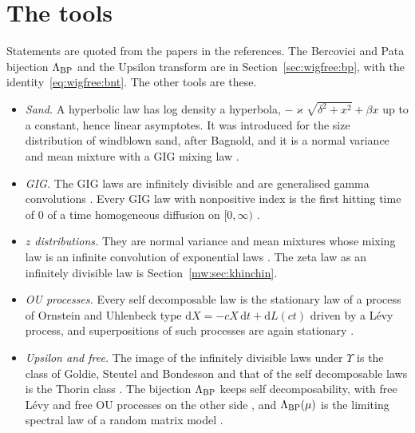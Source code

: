 \section{The tools}\label{bn:sec:tools}
Statements are quoted from the papers in the references. The Bercovici and Pata bijection $\Lambda_{\rm BP}$ and the Upsilon transform are in Section~\ref{sec:wigfree:bp}, with the identity~\eqref{eq:wigfree:bnt}. The other tools are these.
\begin{itemize}
\item \textit{Sand.} A hyperbolic law has log density a hyperbola, $-\varkappa\sqrt{\delta^2+x^2}+\beta x$ up to a constant, hence linear asymptotes. It was introduced for the size distribution of windblown sand, after Bagnold, and it is a normal variance and mean mixture with a GIG mixing law \cite{BN77}.
\item \textit{GIG.} The GIG laws are infinitely divisible \cite{BNH77} and are generalised gamma convolutions \cite{Halgreen79}. Every GIG law with nonpositive index is the first hitting time of $0$ of a time homogeneous diffusion on $[0,\infty)$ \cite{BBH78}.
\item \textit{$z$ distributions.} They are normal variance and mean mixtures whose mixing law is an infinite convolution of exponential laws \cite{BNKS82}. The zeta law as an infinitely divisible law is Section~\ref{mw:sec:khinchin}.
\item \textit{OU processes.} Every self decomposable law is the stationary law of a process of Ornstein and Uhlenbeck type $\mathrm dX=-cX\,\mathrm dt+\mathrm dL(ct)$ driven by a L\'evy process, and superpositions of such processes are again stationary \cite{BNS01,BN01}.
\item \textit{Upsilon and free.} The image of the infinitely divisible laws under $\Upsilon$ is the class of Goldie, Steutel and Bondesson and that of the self decomposable laws is the Thorin class \cite{BNMS06,BNT06}. The bijection $\Lambda_{\rm BP}$ keeps self decomposability, with free L\'evy and free OU processes on the other side \cite{BNT02}, and $\Lambda_{\rm BP}(\mu)$ is the limiting spectral law of a random matrix model \cite{BenaychGeorges05,CabanalDuvillard05}.
\end{itemize}

